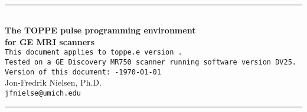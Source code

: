 

\begin{titlepage}
~\\[0.5in]
\begin{centering}
\rule{\textwidth}{5pt}
~\\[0.5in]
{\bf \huge The TOPPE pulse programming environment} \\ [0.4in]
{\bf \huge for GE MRI scanners} \\ [0.6in]
{\tt This document applies to toppe.e version~\toppeversion.   } \\ [0.1in]
{\tt Tested on a GE Discovery MR750 scanner running software version DV25.   } \\ [0.6in]
{\tt Version of this document:~\toppeversion-\today} \\ [1in]
{\large Jon-Fredrik Nielsen, Ph.D.} \\ [0.1in]
{\tt jfnielse@umich.edu} \\ [1.5in]
\rule{\textwidth}{5pt}
\end{centering}
\end{titlepage}


